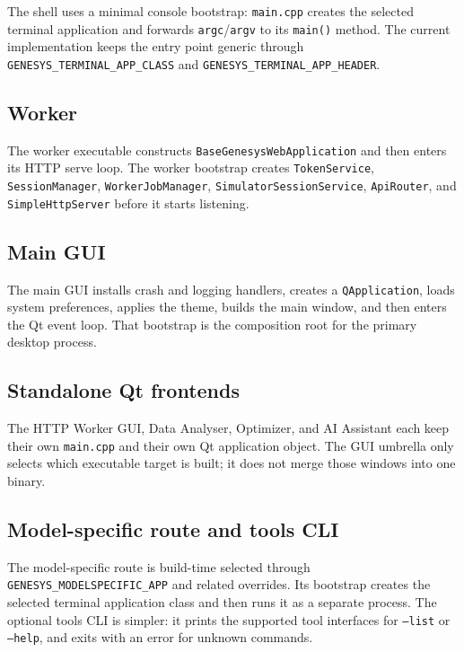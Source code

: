 The shell uses a minimal console bootstrap: \texttt{main.cpp} creates the
selected terminal application and forwards \texttt{argc}/\texttt{argv} to its
\texttt{main()} method. The current implementation keeps the entry point
generic through \texttt{GENESYS\_TERMINAL\_APP\_CLASS} and
\texttt{GENESYS\_TERMINAL\_APP\_HEADER}.

\subsection{Worker}
\label{subsec:application-architecture-worker}

The worker executable constructs \texttt{BaseGenesysWebApplication} and then
enters its HTTP serve loop. The worker bootstrap creates
\texttt{TokenService}, \texttt{SessionManager}, \texttt{WorkerJobManager},
\texttt{SimulatorSessionService}, \texttt{ApiRouter}, and
\texttt{SimpleHttpServer} before it starts listening.

\subsection{Main GUI}
\label{subsec:application-architecture-main-gui}

The main GUI installs crash and logging handlers, creates a
\texttt{QApplication}, loads system preferences, applies the theme, builds the
main window, and then enters the Qt event loop. That bootstrap is the
composition root for the primary desktop process.

\subsection{Standalone Qt frontends}
\label{subsec:application-architecture-standalone-frontends}

The HTTP Worker GUI, Data Analyser, Optimizer, and AI Assistant each keep
their own \texttt{main.cpp} and their own Qt application object. The GUI
umbrella only selects which executable target is built; it does not merge
those windows into one binary.

\subsection{Model-specific route and tools CLI}
\label{subsec:application-architecture-modelspecific-tools}

The model-specific route is build-time selected through
\texttt{GENESYS\_MODELSPECIFIC\_APP} and related overrides. Its bootstrap
creates the selected terminal application class and then runs it as a separate
process. The optional tools CLI is simpler: it prints the supported tool
interfaces for \texttt{--list} or \texttt{--help}, and exits with an error for
unknown commands.

